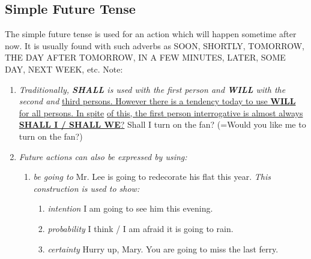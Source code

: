 \subsection{Simple Future Tense}
The simple future tense is used for an action which will happen sometime after
now. It is usually found with such adverbs as SOON, SHORTLY, TOMORROW, THE DAY
AFTER TOMORROW, IN A FEW MINUTES, LATER, SOME DAY, NEXT WEEK, etc.
\newline
\newline
Note:
\begin{enumerate}
    \item {\it Traditionally, {\bf SHALL} is used with the first person
        and {\bf WILL} with the second and}
        \newline
        \underline{third persons. However there is a tendency today to use
        {\bf WILL} for all persons. In spite}
        \newline
        \underline{of this, the first person
        interrogative is almost always {\bf SHALL I / SHALL WE}?}
        \newline
        \newline
        Shall I turn on the fan? (=Would you like me to turn on the fan?)
    \item {\it Future actions can also be expressed by using:}
        \newline
        \newline
        \begin{enumerate}
            \item {\it be going to}
                \newline
                Mr. Lee is going to redecorate his flat this year.
                \newline
                {\it This construction is used to show:}
                \begin{enumerate}
                    \item {\it intention}
                        \newline
                        I am going to see him this evening.
                    \item {\it probability}
                        \newline
                        I think / I am afraid it is going to rain.
                    \item {\it certainty}
                        \newline
                        Hurry up, Mary. You are going to miss the last ferry.

\end{enumerate}
\end{enumerate}
\end{enumerate}
